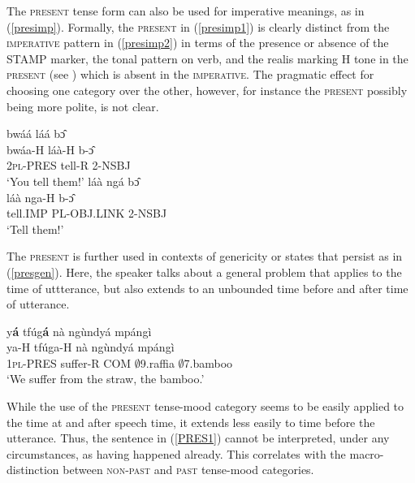 The \textsc{present} tense form can also be used for imperative meanings, as in (\ref{presimp}). 
Formally, the \textsc{present} in (\ref{presimp1}) is clearly distinct from the \textsc{imperative} pattern in (\ref{presimp2}) in terms of the presence or absence of the STAMP marker, the tonal pattern on verb, and the realis marking H tone in the \textsc{present} (see ) which is absent in the \textsc{imperative}. The pragmatic effect for choosing one category over the other, however, for instance the \textsc{present} possibly being more polite, is not clear.

\begin{exe} 
\ex\label{presimp}
\begin{xlist}
\ex\label{presimp1}
  \glll  bwáá láá bɔ̂  \\
         bwáa-H láà-H b-ɔ̂ \\
            2\textsc{pl}-PRES tell-R 2-NSBJ     \\
    \trans `You tell them!'
\ex\label{presimp2}
  \glll  láà ngá bɔ̂ \\
         láà nga-H b-ɔ̂ \\
           tell.IMP PL-OBJ.LINK 2-NSBJ     \\
    \trans `Tell them!'
\end{xlist}
\end{exe}



The \textsc{present} is further used in contexts of genericity or states that persist as in (\ref{presgen}). Here, the speaker talks about a general problem that applies to the time of uttterance, but also extends to an unbounded time before and after time of utterance.

\begin{exe} 
\ex\label{presgen}
  \glll     y{\bfseries á} tfúg{\bfseries á} nà ngùndyá mpángì \\
            ya-H tfúga-H nà ngùndyá mpángì \\
              1\textsc{pl}-PRES suffer-R COM $\emptyset$9.raffia $\emptyset$7.bamboo \\
    \trans `We suffer from the straw, the bamboo.'
\end{exe}

While the use of the \textsc{present} tense-mood category seems to be easily applied to the time at and after speech time, it extends less easily to time before the utterance. Thus, the sentence in (\ref{PRES1}) cannot be interpreted, under any circumstances, as having happened already. This correlates with the macro-distinction between \textsc{non-past} and \textsc{past} tense-mood categories.





